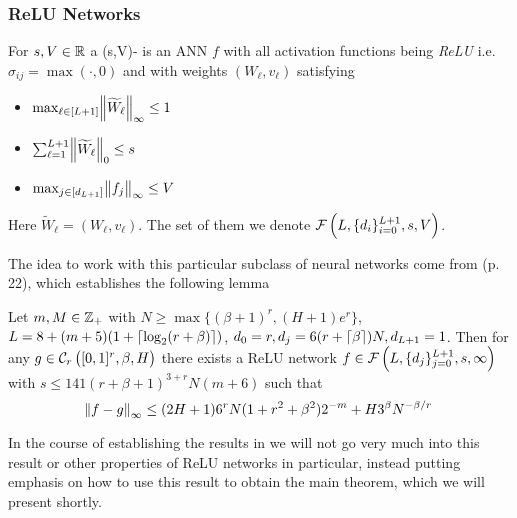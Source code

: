 \subsubsection{ReLU Networks}
\begin{defn}
  For $s,V \in \mathbb{R}$ a (s,V)- is an ANN $f$
  with all activation functions being \emph{ReLU}
  i.e. $\sigma_{ij} = \max(\cdot, 0)$
  and with weights $(W_\ell, v_\ell)$ satisfying
  \begin{multicols}{3}
    \begin{itemize}
      \item $\max_{\ell \in [L+1]} \norm{\widetilde{W}_\ell}_\infty \leq 1$
      \item $\sum_{\ell = 1}^{L+1} \norm{\widetilde{W}_\ell}_0 \leq s$
      \item $\max_{j \in [d_{L+1}]} \norm{f_j}_\infty \leq V$
    \end{itemize}
  \end{multicols}
  Here $\widetilde{W}_\ell = (W_\ell, v_\ell)$.
  The set of them we denote $\mathcal{F}\left(L, \{d_i\}_{i=0}^{L+1},s,V \right)$.
  \label{def:sparseReLU}
\end{defn}
The idea to work with this particular subclass of neural networks come from
 (p. 22), which establishes the following lemma

\begin{lem}
  Let $m,M \in \mathbb{Z}_+$ with $N \geq \max\{(\beta + 1)^r, (H + 1) e^r\}$,
  $L = 8 + (m + 5) (1 + \lceil\log_2(r + \beta)\rceil)$, 
  $d_0 = r, d_j = 6(r + \lceil\beta\rceil) N, d_{L+1} = 1$.
  Then for any $g \in \mathcal{C}_r \left( [0,1]^r, \beta, H \right)$
  there exists a ReLU network
  $f \in \mathcal{F}\left(L, \{d_j\}_{j=0}^{L+1}, s, \infty \right)$
  with $s \leq 141 (r + \beta + 1)^{3 + r} N (m+6)$
  such that
  \begin{equation*}
    \norm{f - g}_\infty \leq (2 H + 1) 6^r N (1 + r^2 + \beta^2) 2^{-m}
    + H 3^{\beta} N^{-\beta/r}
  \end{equation*}
  \label{lem:holderapprox} 
\end{lem} 
\vspace*{-\baselineskip}

In the course of establishing the results in  we will not go
very much into this result or other properties of ReLU networks in particular,
instead putting emphasis on how to use this result to obtain the main
theorem, which we will present shortly.

